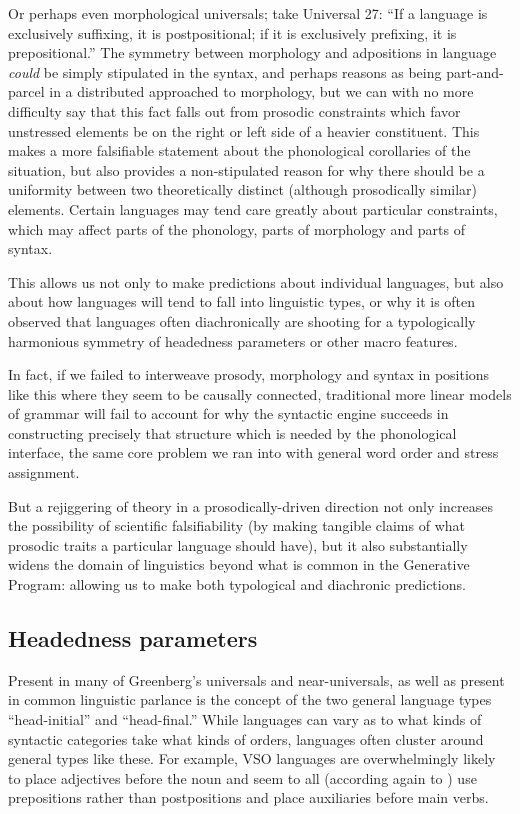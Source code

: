 \documentclass{article}
\begin{document}
Or perhaps even morphological universals; take Universal 27: ``If a language is exclusively suffixing, it is postpositional; if it is exclusively prefixing, it is prepositional.''
The symmetry between morphology and adpositions in language \emph{could} be simply stipulated in the syntax, and perhaps reasons as being part-and-parcel in a distributed approached to morphology, but we can with no more difficulty say that this fact falls out from prosodic constraints which favor unstressed elements be on the right or left side of a heavier constituent.
This makes a more falsifiable statement about the phonological corollaries of the situation, but also provides a non-stipulated reason for why there should be a uniformity between two theoretically distinct (although prosodically similar) elements.
Certain languages may tend care greatly about particular constraints, which may affect parts of the phonology, parts of morphology and parts of syntax.

This allows us not only to make predictions about individual languages, but also about how languages will tend to fall into linguistic types, or why it is often observed that languages often diachronically are shooting for a typologically harmonious symmetry of headedness parameters or other macro features.

In fact, if we failed to interweave prosody, morphology and syntax in positions like this where they seem to be causally connected, traditional more linear models of grammar will fail to account for why the syntactic engine succeeds in constructing precisely that structure which is needed by the phonological interface, the same core problem we ran into with general word order and stress assignment.

But a rejiggering of theory in a prosodically-driven direction not only increases the possibility of scientific falsifiability (by making tangible claims of what prosodic traits a particular language should have), but it also substantially widens the domain of linguistics beyond what is common in the Generative Program: allowing us to make both typological and diachronic predictions.

\subsection{Headedness parameters}

Present in many of Greenberg's universals and near-universals, as well as present in common linguistic parlance is the concept of the two general language types ``head-initial'' and ``head-final.''
While languages can vary as to what kinds of syntactic categories take what kinds of orders, languages often cluster around general types like these.
For example, VSO languages are overwhelmingly likely to place adjectives before the noun and seem to all (according again to \textcite{greenberg63}) use prepositions rather than postpositions and place auxiliaries before main verbs.
\end{document}
